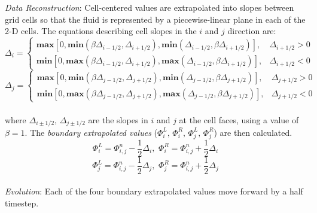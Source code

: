 \documentclass{homework}
\begin{document}
\noindent \emph{Data Reconstruction}: Cell-centered values are extrapolated into slopes between grid cells so that the fluid is represented by a piecewise-linear plane in each of the 2-D cells. The equations describing cell slopes in the $i$ and $j$ direction are:
\begin{equation*}
    \Delta_i = \begin{cases}
        \textbf{max}[0,\textbf{min}(\beta\Delta_{i-1/2},\Delta_{i+1/2}),\textbf{min}(\Delta_{i-1/2},\beta\Delta_{i+1/2})], & \Delta_{i+1/2} > 0 \\
        \textbf{min}[0,\textbf{max}(\beta\Delta_{i-1/2},\Delta_{i+1/2}),\textbf{max}(\Delta_{i-1/2},\beta\Delta_{i+1/2})], & \Delta_{i+1/2} < 0
    \end{cases}
\end{equation*}
\begin{equation*}
    \Delta_j = \begin{cases}
        \textbf{max}[0,\textbf{min}(\beta\Delta_{j-1/2},\Delta_{j+1/2}),\textbf{min}(\Delta_{j-1/2},\beta\Delta_{j+1/2})], & \Delta_{j+1/2} > 0 \\
        \textbf{min}[0,\textbf{max}(\beta\Delta_{j-1/2},\Delta_{j+1/2}),\textbf{max}(\Delta_{j-1/2},\beta\Delta_{j+1/2})], & \Delta_{j+1/2} < 0
    \end{cases}
\end{equation*} \\
\noindent where $\Delta_{i\pm1/2}, \, \Delta_{j\pm1/2}$ are the slopes in $i$ and $j$ at the cell faces, using a value of $\beta = 1$. The \emph{boundary extrapolated values} ($\Phi_i^L, \, \Phi_i^R, \, \Phi_j^L, \, \Phi_j^R$) are then calculated.
\[ \Phi_i^L = \Phi_{i,j}^n - \frac{1}{2} \Delta_i, \,\, \Phi_i^R = \Phi_{i,j}^n + \frac{1}{2} \Delta_i \]
\[ \Phi_j^L = \Phi_{i,j}^n - \frac{1}{2} \Delta_j, \,\, \Phi_j^R = \Phi_{i,j}^n + \frac{1}{2} \Delta_j \]
\\
\noindent \emph{Evolution}: Each of the four boundary extrapolated values move forward by a half timestep.
\end{document}
